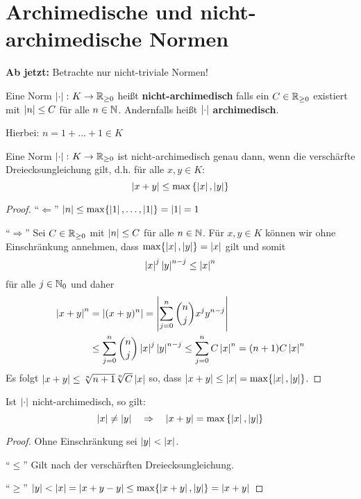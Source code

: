 
\section{Archimedische und nicht-archimedische Normen}

\textbf{Ab jetzt:} Betrachte nur nicht-triviale Normen!

\begin{defi}
Eine Norm $\left|{\cdot}\right| \colon K \to \operatorname{\mathbb{R}_{\geq 0}}$ heißt \textbf{nicht-archimedisch} falls ein $C \in \operatorname{\mathbb{R}_{\geq 0}}$ existiert mit $\left|{n}\right| \leq C$ für alle $n\in \mathbb{N}$.
Andernfalls heißt  $\left|{\cdot}\right|$ \textbf{archimedisch}.

Hierbei: $n = 1+ \dots + 1 \in K$
\end{defi}

\begin{Prop}
Eine Norm $\left|{\cdot}\right| \colon K \to \operatorname{\mathbb{R}_{\geq 0}}$ ist nicht-archimedisch genau dann, wenn die verschärfte Dreiecksungleichung gilt, d.h. für alle $x,y \in K$:
\[ \left|{x+y}\right| \leq \max \left\{ \left|{x}\right|, \left|{y}\right| \right\}
\] 
\end{Prop}

\begin{proof}
\enquote{$\Leftarrow$} $\left|{n}\right| \leq \max\{ \left|{1}\right|, \dots, \left|{1}\right| \} = \left|{1}\right| = 1$

\bigskip \enquote{$\Rightarrow$}
Sei $C\in\operatorname{\mathbb{R}_{\geq 0}}$ mit $\left|{n}\right| \leq C$ für alle $n\in\mathbb{N}$. Für $x,y \in K$ können wir ohne Einschränkung annehmen, dass $\max \{\left|{x}\right|, \left|{y}\right|  \} = \left|{x}\right|$ gilt und somit
\[ \left|{x}\right|^j \left|{y}\right|^{n-j} \leq \left|{x}\right|^n
\]
für alle $j \in\mathbb{N}_0$ und daher
\begin{align*}
\left|{x+y}\right|^n
&= \left|{(x+y)^n}\right|
= \left|{ \sum_{j=0}^{n} \binom{n}{j} x^j y^{n-j}  }\right|\\
&\leq \sum_{j=0}^{n} \binom{n}{j} \left|{x}\right|^j \left|{y}\right|^{n-j} 
\leq \sum_{j=0}^{n} C \left|{x}\right|^n
=(n+1)C\left|{x}\right|^n
\end{align*}
Es folgt $ \left|{x+y}\right| \leq \sqrt[n]{n+1} \sqrt[n]{C} \left|{x}\right|$ so, dass
$ \left|{x+y}\right| \leq  \left|{x}\right| = \max \{\left|{x}\right|, \left|{y}\right|  \} $.
\end{proof}


\begin{Bem}
Ist $\left|{\cdot}\right|$ nicht-archimedisch, so gilt:
\[ \left|{x}\right| \neq \left|{y}\right| \quad \Rightarrow \quad 
\left|{x+y}\right| = \max \left\{ \left|{x}\right|, \left|{y}\right| \right\} 
\]
\end{Bem}

\begin{proof}
Ohne Einschränkung sei $\left|{y}\right| < \left|{x}\right|$.

\enquote{$\leq$} Gilt nach der verschärften Dreiecksungleichung.

\enquote{$\geq$} $\left|{y}\right| < \left|{x}\right| = \left|{x+y-y}\right| \leq \max \{ \left|{x+y}\right|, \left|{y}\right| \}
= \left|{x+y}\right|$
\end{proof}


